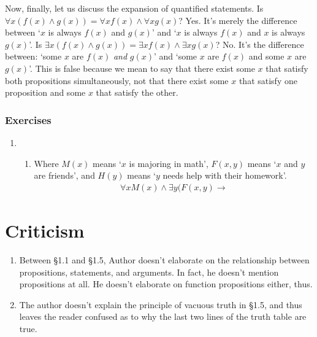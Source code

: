 \documentclass[a4paper, 11pt]{article}
\begin{document}
Now, finally, let us discuss the expansion of quantified statements. Is $\forall x (f(x) \wedge g(x)) = \forall x f(x) \wedge \forall x g(x)$? Yes. It's merely the difference between `$x$ is always $f(x)$ and $g(x)$' and `$x$ is always $f(x)$ and $x$ is always $g(x)$'. Is $\exists x (f(x) \wedge g(x)) = \exists x f(x) \wedge \exists x g(x)$? No. It's the difference between: `some $x$ are $f(x)$ \textit{and} $g(x)$' and `some $x$ are $f(x)$ and some $x$ are $g(x)$'. This is false because we mean to say that there exist some $x$ that satisfy both propositions simultaneously, not that there exist some $x$ that satisfy one proposition and some $x$ that satisfy the other.


\clearpage
\subsubsection{Exercises}

\begin{enumerate}
	\item 
	\begin{enumerate}
		\item Where $M(x)$ means `$x$ is majoring in math', $F(x,y)$ means `$x$ and $y$ are friends', and $H(y)$ means `$y$ needs help with their homework'.
			\begin{align*}
				\forall x M(x) \wedge \exists y( F(x,y) \rightarrow 
			\end{align*}
	\end{enumerate}
\end{enumerate}

\clearpage
\section{Criticism}
\begin{enumerate}
  \item Between \S 1.1 and \S 1.5, Author doesn't elaborate on the relationship between propositions, statements, and arguments. In fact, he doesn't mention propositions at all. He doesn't elaborate on function propositions either, thus.
  \item The author doesn't explain the principle of vacuous truth in \S 1.5, and thus leaves the reader confused as to why the last two lines of the truth table are true.
\end{enumerate}
\end{document}
